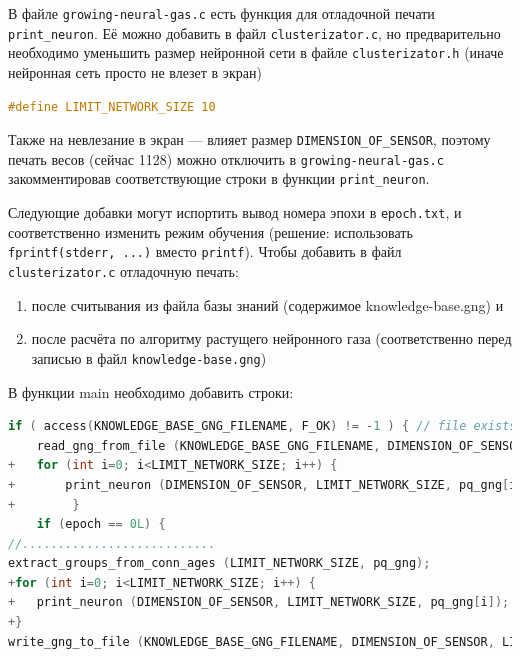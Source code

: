 \documentclass[unicode, 12pt, a4paper,oneside,fleqn]{article}
\begin{document}
В файле \verb'growing-neural-gas.c' есть функция для отладочной печати
\verb'print_neuron'.  Её можно добавить в файл \verb'clusterizator.c',
но предварительно необходимо уменьшить размер нейронной сети в файле
\verb'clusterizator.h' (иначе нейронная сеть просто не влезет в экран)

\begin{lstlisting}[language=C,
  caption={Файл clusterizator.h},
  captionpos=b,
  label={free:code}]
#define LIMIT_NETWORK_SIZE 10
\end{lstlisting}

Также на невлезание в экран --- влияет размер
\verb'DIMENSION_OF_SENSOR', поэтому печать весов (сейчас 1128) можно
отключить в \verb'growing-neural-gas.c' закомментировав
соответствующие строки в функции \verb'print_neuron'.



Следующие добавки могут испортить вывод номера эпохи в
\verb'epoch.txt', и соответственно изменить режим обучения (решение:
использовать \verb'fprintf(stderr, ...)' вместо \verb'printf'). Чтобы
добавить в файл \verb'clusterizator.c' отладочную печать:
\begin{enumerate}
\item после считывания из файла базы знаний (содержимое
  knowledge-base.gng) и
\item после расчёта по алгоритму растущего нейронного газа
  (соответственно перед записью в файл \verb'knowledge-base.gng')
\end{enumerate}
В функции main необходимо добавить строки:

\begin{lstlisting}[language=C,
  caption={Файл clusterizator.c},
  captionpos=b,
  label={free:code}]
if ( access(KNOWLEDGE_BASE_GNG_FILENAME, F_OK) != -1 ) { // file exists
	read_gng_from_file (KNOWLEDGE_BASE_GNG_FILENAME, DIMENSION_OF_SENSOR, LIMIT_NETWORK_SIZE, pq_gng);
+	for (int i=0; i<LIMIT_NETWORK_SIZE; i++) {
+		print_neuron (DIMENSION_OF_SENSOR, LIMIT_NETWORK_SIZE, pq_gng[i]);
+        }
	if (epoch == 0L) {
//...........................
extract_groups_from_conn_ages (LIMIT_NETWORK_SIZE, pq_gng);
+for (int i=0; i<LIMIT_NETWORK_SIZE; i++) {
+	print_neuron (DIMENSION_OF_SENSOR, LIMIT_NETWORK_SIZE, pq_gng[i]);
+}
write_gng_to_file (KNOWLEDGE_BASE_GNG_FILENAME, DIMENSION_OF_SENSOR, LIMIT_NETWORK_SIZE, pq_gng);
\end{lstlisting}
\end{document}
